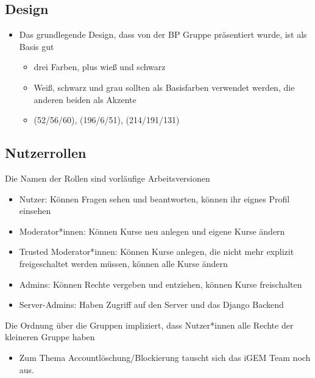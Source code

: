 \documentclass[colorback, accentcolor=tud1c, paper=a4]{tudexercise}
\begin{document}
\begin{multicols}{2}
		\subsection*{Design}
		\begin{itemize}
			\item Das grundlegende Design, dass von der BP Gruppe präsentiert wurde, ist als Basis gut
			\begin{itemize}
				\item drei Farben, plus wieß und schwarz
				\item Weiß, schwarz und grau sollten als Basisfarben verwendet werden, die anderen beiden als Akzente
				\item (52/56/60), (196/6/51), (214/191/131)
			\end{itemize}
		\end{itemize}
		
		\subsection*{Nutzerrollen}
		Die Namen der Rollen sind vorläufige Arbeitsversionen
		\begin{itemize}
			\item Nutzer: Können Fragen sehen und beantworten, können ihr eignes Profil einsehen
			\item Moderator*innen: Können Kurse neu anlegen und eigene Kurse ändern
			\item Trusted Moderator*innen: Können Kurse anlegen, die nicht mehr explizit freigeschaltet werden müssen, können alle Kurse ändern
			\item Admins: Können Rechte vergeben und entziehen, können Kurse freischalten
			\item Server-Admins: Haben Zugriff auf den Server und das Django Backend
		\end{itemize}
		Die Ordnung über die Gruppen impliziert, dass Nutzer*innen alle Rechte der kleineren Gruppe haben
		\begin{itemize}
			\item Zum Thema Accountlöschung/Blockierung tauscht sich das iGEM Team noch aus.
		\end{itemize}
		

\end{multicols}
\end{document}
